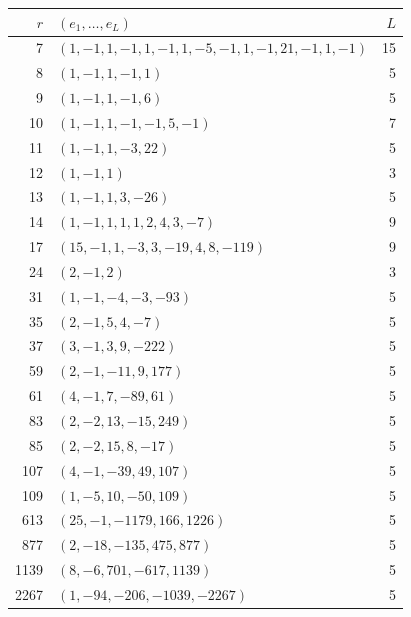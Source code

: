 \begin{center}\small
\begin{tabular}{r@{\quad}l@{\quad}r}
\toprule
$r$&$(e_1,\ldots,e_L)$&$L$\\
\midrule
7&$(1,-1,1,-1,1,-1,1,-5,-1,1,-1,21,-1,1,-1)$&15\\[2pt]
8&$(1,-1,1,-1,1)$&5\\[2pt]
9&$(1,-1,1,-1,6)$&5\\[2pt]
10&$(1,-1,1,-1,-1,5,-1)$&7\\[2pt]
11&$(1,-1,1,-3,22)$&5\\[2pt]
12&$(1,-1,1)$&3\\[2pt]
13&$(1,-1,1,3,-26)$&5\\[2pt]
14&$(1,-1,1,1,1,2,4,3,-7)$&9\\[2pt]
17&$(15,-1,1,-3,3,-19,4,8,-119)$&9\\[2pt]
24&$(2,-1,2)$&3\\[2pt]
31&$(1,-1,-4,-3,-93)$&5\\[2pt]
35&$(2,-1,5,4,-7)$&5\\[2pt]
37&$(3,-1,3,9,-222)$&5\\[2pt]
59&$(2,-1,-11,9,177)$&5\\[2pt]
61&$(4,-1,7,-89,61)$&5\\[2pt]
83&$(2,-2,13,-15,249)$&5\\[2pt]
85&$(2,-2,15,8,-17)$&5\\[2pt]
107&$(4,-1,-39,49,107)$&5\\[2pt]
109&$(1,-5,10,-50,109)$&5\\[2pt]
613&$(25,-1,-1179,166,1226)$&5\\[2pt]
877&$(2,-18,-135,475,877)$&5\\[2pt]
1139&$(8,-6,701,-617,1139)$&5\\[2pt]
2267&$(1,-94,-206,-1039,-2267)$&5\\[2pt]
\bottomrule
\end{tabular}
\end{center}
